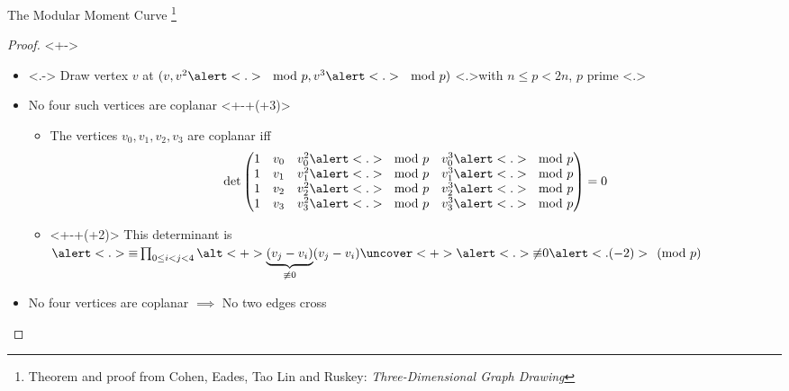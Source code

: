 \documentclass[t]{beamer}
\newcommand\footcite[1]{%
  \begingroup
  \renewcommand\thefootnote{}\footnote{#1}%
  \addtocounter{footnote}{-1}%
  \endgroup
}
\begin{document}
\begin{frame}{The Modular Moment Curve}
    \footcite{Theorem and proof from Cohen, Eades, Tao Lin and Ruskey: \textit{Three-Dimensional Graph Drawing}}
    \begin{proof}<+->
	\begin{itemize}
	    \item<.-> Draw vertex $v$ at $(v, v^2\alert<.>{\mod p}, v^3\alert<.>{\mod p})$ \alert<.>{with $n \le p < 2n$, $p$ prime}
		\only<.>{
		    \begin{center}
		    \end{center}
		}
	    \item<+-> No four such vertices are coplanar
		\only<+-+(+3)>{
		    \begin{itemize}
			\item The vertices $v_0, v_1, v_2, v_3$ are coplanar iff 
			    \begin{equation*}
				\det\left(
				\begin{matrix}
				    1&v_0&v_0^2\alert<.>{\mod p}&v_0^3\alert<.>{\mod p}\\
				    1&v_1&v_1^2\alert<.>{\mod p}&v_1^3\alert<.>{\mod p}\\
				    1&v_2&v_2^2\alert<.>{\mod p}&v_2^3\alert<.>{\mod p}\\
				    1&v_3&v_3^2\alert<.>{\mod p}&v_3^3\alert<.>{\mod p}\\
				\end{matrix}
			    \right) = 0
			    \end{equation*}
			\item<+-+(+2)> {
				This determinant is $\alert<.>{\equiv} \prod_{0 \le i < j < 4} \alt<+>{\underbrace{(v_j-v_i)}_{\not\equiv0}}{(v_j - v_i)} \uncover<+>{\alert<.>{\not\equiv} 0} \alert<.(-2)>{\pmod p}$
			}
		    \end{itemize}
		}
	    \item<+-> No four vertices are coplanar $\implies$ No two edges cross
	\end{itemize}
    \end{proof}
\end{frame}
\end{document}
